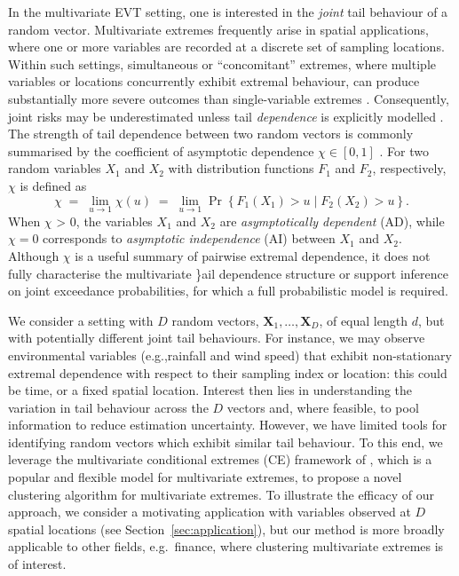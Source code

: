 \documentclass[12pt,compact]{article}
\begin{document}
In the multivariate EVT setting, one is interested in the \emph{joint} tail behaviour of a random vector.
Multivariate extremes frequently arise in spatial applications, where one or more variables are recorded at a discrete set of sampling locations.
Within such settings, simultaneous or ``concomitant'' extremes, where multiple variables or locations concurrently exhibit extremal behaviour, can produce substantially more severe outcomes than single-variable extremes \citep{zscheischler2018future, bevacqua2021guidelines, Rohrbeck2021, Sando2022}.
Consequently, joint risks may be underestimated unless tail \emph{dependence} is explicitly modelled \citep{Zhang2024}. 
The strength of tail dependence between two random vectors is commonly summarised by the coefficient of asymptotic dependence \(\chi\in[0,1]\) \citep[see e.g.,][]{Coles1999}.
For two random variables $X_1$ and $X_2$ with distribution functions $F_1$ and $F_2$, respectively, $\chi$ is defined as
\begin{equation} \label{eq:chi}
  \chi \;=\; \lim_{u\to 1} \chi(u) \;=\; \lim_{u\to 1}\Pr\left\{F_1(X_1)>u \mid F_2(X_2)>u\right\}.
\end{equation}
When $\chi$ > 0, the variables $X_1$ and $X_2$ are \emph{asymptotically dependent} (AD), while $\chi=0$ corresponds to \emph{asymptotic independence} (AI) between $X_1$ and $X_2$.
Although \(\chi\) is a useful summary of pairwise extremal dependence, it does not fully characterise the multivariate \}ail dependence structure or support inference on joint exceedance probabilities, for which a full probabilistic model is required.

We consider a setting with $D$ random vectors, $\symbf{X}_1, \ldots, \symbf{X}_D$, of equal length $d$, but with potentially different joint tail behaviours. 
For instance, we may observe environmental variables (e.g.,\@ rainfall and wind speed) that exhibit non-stationary extremal dependence with respect to their sampling index or location: this could be time, or a fixed spatial location. 
Interest then lies in understanding the variation in tail behaviour across the $D$ vectors and, where feasible, to pool information to reduce estimation uncertainty. 
However, we have limited tools for identifying random vectors which exhibit similar tail behaviour.
To this end, we leverage the multivariate conditional extremes (CE) framework of \citet{Heffernan2004}, which is a popular and flexible model for multivariate extremes, to propose a novel clustering algorithm for multivariate extremes.
To illustrate the efficacy of our approach, we consider a motivating application with variables observed at $D$ spatial locations (see Section~\ref{sec:application}), but our method is more broadly applicable to other fields, e.g.\ finance, where clustering multivariate extremes is of interest. 
\end{document}
